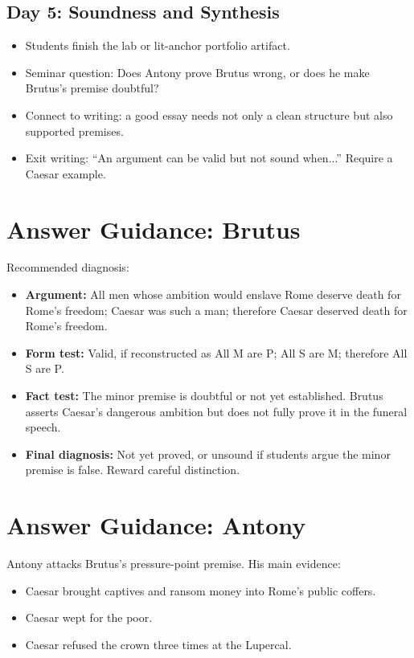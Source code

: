 \documentclass[12pt]{article}
\begin{document}
\subsection*{Day 5: Soundness and Synthesis}
\begin{itemize}[leftmargin=*]
\item Students finish the lab or lit-anchor portfolio artifact.
\item Seminar question: Does Antony prove Brutus wrong, or does he make Brutus's premise doubtful?
\item Connect to writing: a good essay needs not only a clean structure but also supported premises.
\item Exit writing: ``An argument can be valid but not sound when...'' Require a Caesar example.
\end{itemize}

\section*{Answer Guidance: Brutus}
Recommended diagnosis:
\begin{itemize}[leftmargin=*]
\item \textbf{Argument:} All men whose ambition would enslave Rome deserve death for Rome's freedom; Caesar was such a man; therefore Caesar deserved death for Rome's freedom.
\item \textbf{Form test:} Valid, if reconstructed as All M are P; All S are M; therefore All S are P.
\item \textbf{Fact test:} The minor premise is doubtful or not yet established. Brutus asserts Caesar's dangerous ambition but does not fully prove it in the funeral speech.
\item \textbf{Final diagnosis:} Not yet proved, or unsound if students argue the minor premise is false. Reward careful distinction.
\end{itemize}

\section*{Answer Guidance: Antony}
Antony attacks Brutus's pressure-point premise. His main evidence:
\begin{itemize}[leftmargin=*]
\item Caesar brought captives and ransom money into Rome's public coffers.
\item Caesar wept for the poor.
\item Caesar refused the crown three times at the Lupercal.
\end{itemize}
\end{document}
